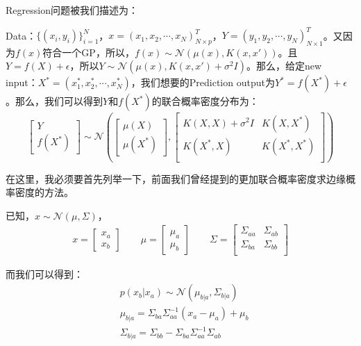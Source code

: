 \documentclass[a4paper]{article}
\begin{document}
Regression问题被我们描述为：

Data：$\{ (x_i,y_i) \}_{i=1}^N$，$x=(x_1,x_2,\cdots,x_N)^T_{N\times p}$，$Y=(y_1,y_2,\cdots,y_N)^T_{N\times 1}$。又因为$f(x)$符合一个GP，所以，$f(x) \sim \mathcal{N}(\mu(x),K(x,x'))$。且$Y=f(X)+\epsilon$，所以$Y\sim \mathcal{N}(\mu(x),K(x,x')+\sigma^2I)$。那么，给定new input：$X^\ast = (x_1^\ast,x_2^\ast,\cdots,x_N^\ast)$，我们想要的Prediction output为$Y^\ast = f(X^\ast) + \epsilon$。那么，我们可以得到$Y$和$f(X^\ast)$的联合概率密度分布为：
\begin{equation}
    \begin{bmatrix}
        Y \\
        f(X^\ast)
    \end{bmatrix}
\sim
\mathcal{N}\left(
    \begin{bmatrix}
        \mu(X) \\
        \mu(X^\ast)
    \end{bmatrix}
    ,
    \begin{bmatrix}
        K(X,X)+\sigma^2I & K(X,X^\ast) \\
        K(X^\ast,X) & K(X^\ast,X^\ast) \\
    \end{bmatrix}
\right)
\end{equation}

在这里，我必须要首先列举一下，前面我们曾经提到的更加联合概率密度求边缘概率密度的方法。

已知，$x\sim \mathcal{N}(\mu,\Sigma)$，
\begin{equation}
    \begin{split}
        x = 
        \begin{bmatrix}
            x_a \\
            x_b
        \end{bmatrix}
        \qquad
        \mu = 
        \begin{bmatrix}
            \mu_a \\
            \mu_b
        \end{bmatrix}
        \qquad
        \Sigma = 
        \begin{bmatrix}
            \Sigma_{aa} & \Sigma_{ab}\\
            \Sigma_{ba} & \Sigma_{bb}\\
        \end{bmatrix}
    \end{split}
\end{equation}

而我们可以得到：
\begin{equation}
    \begin{split}
        & p(x_b|x_a)\sim \mathcal{N}(\mu_{b|a},\Sigma_{b|a}) \\
        & \mu_{b|a} = \Sigma_{ba}\Sigma_{aa}^{-1}(x_a - \mu_a)+\mu_b \\
        & \Sigma_{b|a} = \Sigma_{bb} - \Sigma_{ba}\Sigma_{aa}^{-1}\Sigma_{ab} \\
    \end{split}
\end{equation}
\end{document}

